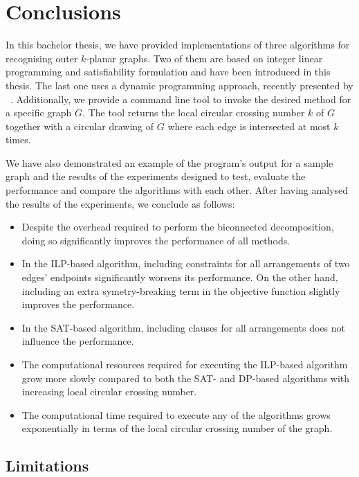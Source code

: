 \chapter{Conclusions}\label{ch:conclusions}

In this bachelor thesis, we have provided implementations of three algorithms for recognising outer \(k\)-planar graphs. Two of them are based on integer linear programming and satisfiability formulation and have been introduced in this thesis. The last one uses a dynamic programming approach, recently presented by \citeauthor{okp}~\cite{okp}. Additionally, we provide a command line tool to invoke the desired method for a specific graph \(G\). The tool returns the local circular crossing number \(k\) of \(G\) together with a circular drawing of \(G\) where each edge is intersected at most \(k\) times.

We have also demonstrated an example of the program's output for a sample graph and the results of the experiments designed to test, evaluate the performance and compare the algorithms with each other. After having analysed the results of the experiments, we conclude as follows:
\begin{itemize}
    \item Despite the overhead required to perform the biconnected decomposition, doing so significantly improves the performance of all methods.
    \item In the ILP-based algorithm, including constraints for all arrangements of two edges' endpoints significantly worsens its performance. On the other hand, including an extra symetry-breaking term in the objective function slightly improves the performance.
    \item In the SAT-based algorithm, including clauses for all arrangements does not influence the performance.
    \item The computational resources required for executing the ILP-based algorithm grow more slowly compared to both the SAT- and DP-based algorithms with increasing local circular crossing number.
    \item The computational time required to execute any of the algorithms grows exponentially in terms of the local circular crossing number of the graph.
\end{itemize}

\section{Limitations}

